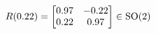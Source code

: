 \documentclass[preview]{standalone}
\begin{document}
\begin{align*}
\special{dvisvgm:raw <g id='unique000'>}R(0.22) = \begin{bmatrix} 0.97 & -0.22 \\ 0.22 & 0.97 \end{bmatrix} \in \text{SO}(2)\special{dvisvgm:raw </g>}
\end{align*}
\end{document}
